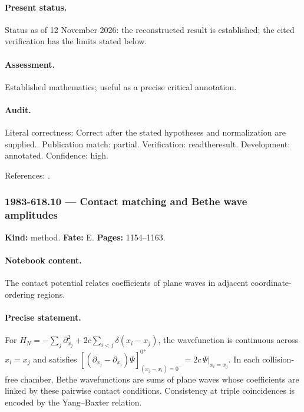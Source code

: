 \paragraph{Present status.} Status as of 12 November 2026: the reconstructed result is established; the cited verification has the limits stated below.

\paragraph{Assessment.} Established mathematics; useful as a precise critical annotation.

\paragraph{Audit.} Literal correctness: Correct after the stated hypotheses and normalization are supplied.. Publication match: partial. Verification: readtheresult. Development: annotated. Confidence: high.

\noindent References: \citep{yang1967manybody}.\par

\subsubsection{1983-618.10 --- Contact matching and Bethe wave amplitudes}

\label{item:1983-618.10}

\noindent\textbf{Kind:} method. \textbf{Fate:} E. \textbf{Pages:} 1154--1163.\par

\paragraph{Notebook content.} The contact potential relates coefficients of plane waves in adjacent coordinate-ordering regions.

\paragraph{Precise statement.} For $H_N=-\sum_j\partial_{x_j}^2+2c\sum_{i<j}\delta(x_i-x_j)$, the wavefunction is continuous across $x_i=x_j$ and satisfies $[(\partial_{x_j}-\partial_{x_i})\Psi]_{(x_j-x_i)=0^-}^{0^+}=2c\,\Psi|_{x_i=x_j}$. In each collision-free chamber, Bethe wavefunctions are sums of plane waves whose coefficients are linked by these pairwise contact conditions. Consistency at triple coincidences is encoded by the Yang--Baxter relation.

